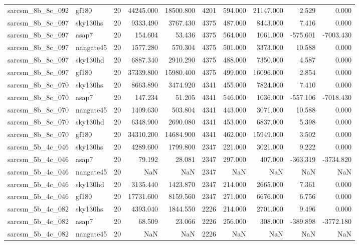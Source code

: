 \documentclass{article}
\begin{document}
\begin{longtable}{llrrrrrrrr}
sarcsm\_8b\_8c\_092 & gf180 & 20 & 44245.000 & 18500.800 & 4201 & 594.000 & 21147.000 & 2.529 & 0.000 \\
sarcsm\_8b\_8c\_097 & sky130hs & 20 & 9333.490 & 3767.430 & 4375 & 487.000 & 8443.000 & 7.416 & 0.000 \\
sarcsm\_8b\_8c\_097 & asap7 & 20 & 154.604 & 53.436 & 4375 & 564.000 & 1061.000 & -575.601 & -7003.430 \\
sarcsm\_8b\_8c\_097 & nangate45 & 20 & 1577.280 & 570.304 & 4375 & 501.000 & 3373.000 & 10.588 & 0.000 \\
sarcsm\_8b\_8c\_097 & sky130hd & 20 & 6887.340 & 2910.290 & 4375 & 488.000 & 7350.000 & 4.587 & 0.000 \\
sarcsm\_8b\_8c\_097 & gf180 & 20 & 37339.800 & 15980.400 & 4375 & 499.000 & 16096.000 & 2.854 & 0.000 \\
sarcsm\_8b\_8c\_070 & sky130hs & 20 & 8663.890 & 3474.920 & 4341 & 455.000 & 7824.000 & 7.410 & 0.000 \\
sarcsm\_8b\_8c\_070 & asap7 & 20 & 147.234 & 51.205 & 4341 & 546.000 & 1036.000 & -557.106 & -7018.430 \\
sarcsm\_8b\_8c\_070 & nangate45 & 20 & 1409.630 & 503.804 & 4341 & 443.000 & 3071.000 & 10.588 & 0.000 \\
sarcsm\_8b\_8c\_070 & sky130hd & 20 & 6348.900 & 2690.080 & 4341 & 453.000 & 6837.000 & 5.398 & 0.000 \\
sarcsm\_8b\_8c\_070 & gf180 & 20 & 34310.200 & 14684.900 & 4341 & 462.000 & 15949.000 & 3.502 & 0.000 \\
sarcsm\_5b\_4c\_046 & sky130hs & 20 & 4289.600 & 1799.800 & 2347 & 221.000 & 3021.000 & 9.222 & 0.000 \\
sarcsm\_5b\_4c\_046 & asap7 & 20 & 79.192 & 28.081 & 2347 & 297.000 & 407.000 & -363.319 & -3734.820 \\
sarcsm\_5b\_4c\_046 & nangate45 & 20 & NaN & NaN & 2347 & NaN & NaN & NaN & NaN \\
sarcsm\_5b\_4c\_046 & sky130hd & 20 & 3135.440 & 1423.870 & 2347 & 214.000 & 2665.000 & 7.361 & 0.000 \\
sarcsm\_5b\_4c\_046 & gf180 & 20 & 17731.600 & 8159.560 & 2347 & 271.000 & 6676.000 & 6.756 & 0.000 \\
sarcsm\_5b\_4c\_082 & sky130hs & 20 & 4393.040 & 1844.550 & 2226 & 214.000 & 2701.000 & 9.496 & 0.000 \\
sarcsm\_5b\_4c\_082 & asap7 & 20 & 68.509 & 23.066 & 2226 & 256.000 & 308.000 & -389.898 & -3772.180 \\
sarcsm\_5b\_4c\_082 & nangate45 & 20 & NaN & NaN & 2226 & NaN & NaN & NaN & NaN \\

\end{longtable}
\end{document}
